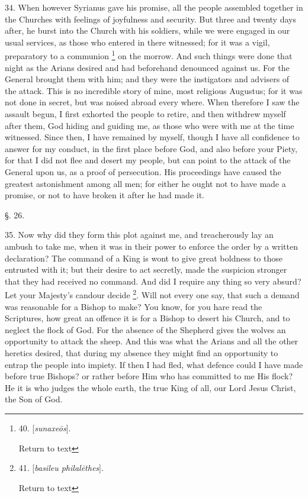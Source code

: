 34. When however Syrianus gave his promise, all the people assembled
together in the Churches with feelings of joyfulness and security. But
three and twenty days after, he burst into the Church with his
soldiers, while we were engaged in our usual services, as those
who entered in there witnessed; for it was a vigil, preparatory to a
communion \footnote{40. [\emph{sunaxe\={o}s}].

Return to text} on the
morrow. And such things were done that night as the Arians desired and
had beforehand denounced against us. For the General brought them with
him; and they were the instigators and advisers of the attack. This is
no incredible story of mine, most religious Augustus; for it was not
done in secret, but was noised abroad every where. When therefore I
saw the assault begun, I first exhorted the people to retire, and then
withdrew myself after them, God hiding and guiding me, as those who
were with me at the time witnessed. Since then, I have remained by
myself, though I have all confidence to answer for my conduct, in the
first place before God, and also before your Piety, for that I did not
flee and desert my people, but can point to the attack of the General
upon us, as a proof of persecution. His proceedings have caused the
greatest astonishment among all men; for either he ought not to have
made a promise, or not to have broken it after he had made it.

§. 26.

35. Now why did they form this plot against me, and treacherously lay an
ambush to take me, when it was in their power to enforce the order by
a written declaration? The command of a King is wont to give great
boldness to those entrusted with it; but their desire to act secretly,
made the suspicion stronger that they had received no command. And did
I require any thing so very absurd? Let your Majesty's candour decide
\footnote{41. [\emph{basileu
philal\={e}thes}].

Return to text}. Will not every one
say, that such a demand was reasonable for a Bishop to make? You know,
for you hare read the Scriptures, how great an offence it is for a
Bishop to desert his Church, and to neglect the flock of God. For the
absence of the Shepherd gives the wolves an opportunity to attack the
sheep. And this was what the Arians and all the other heretics
desired, that during my absence they might find an opportunity to
entrap the people into impiety. If then I had fled, what defence could
I have made before true Bishops? or rather before Him who has
committed to me His flock? He it is who judges the whole earth, the
true King of all, our Lord Jesus Christ, the Son of God.

